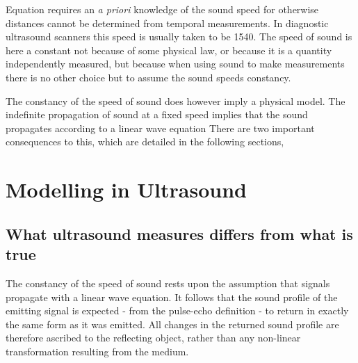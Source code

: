 Equation  requires an {\em a priori} knowledge of the sound speed
for otherwise distances cannot be determined from temporal measurements.
In diagnostic ultrasound scanners this speed is usually taken to be \unit{1540}\metre\reciprocal\second.
The speed of sound is here a constant not because of some physical law, 
or because it is a quantity independently measured,
but because when using sound to make measurements 
there is no other choice  but to assume the sound speeds constancy. %

The constancy of the speed of sound does however imply a physical model.  
The indefinite propagation of sound at a fixed speed implies that the sound propagates according to a linear wave equation
There are two important consequences to this, which are detailed in the following sections,

\section{Modelling in Ultrasound}
\subsection{What ultrasound measures differs from what is true}


The constancy of the speed of sound rests upon the assumption that signals propagate with a linear wave equation.
It follows that the sound profile of the emitting signal is expected - from the pulse-echo definition -
to return in exactly the same form as it was emitted.
All changes in the returned sound profile are therefore ascribed to the reflecting object,
rather than any non-linear transformation resulting from the medium.


